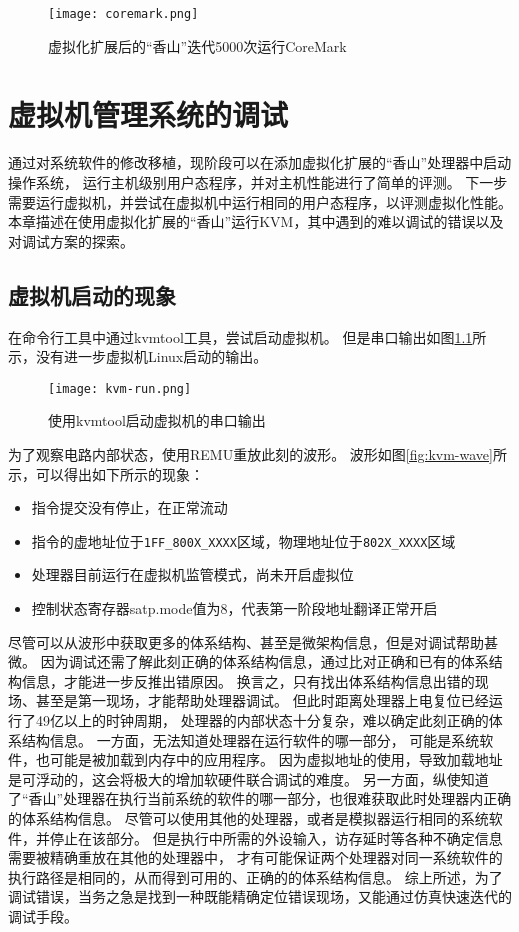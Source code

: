 \begin{figure}[htbp]
    \centering
\texttt{[image: coremark.png]}
\caption{虚拟化扩展后的“香山”迭代5000次运行CoreMark}
\label{fig:coremark}
\end{figure}

\chapter{虚拟机管理系统的调试}
通过对系统软件的修改移植，现阶段可以在添加虚拟化扩展的“香山”处理器中启动操作系统，
运行主机级别用户态程序，并对主机性能进行了简单的评测。
下一步需要运行虚拟机，并尝试在虚拟机中运行相同的用户态程序，以评测虚拟化性能。
本章描述在使用虚拟化扩展的“香山”运行KVM，其中遇到的难以调试的错误以及对调试方案的探索。

\section{虚拟机启动的现象}
在命令行工具中通过kvmtool工具，尝试启动虚拟机。
但是串口输出如图\ref{fig:kvm-run}所示，没有进一步虚拟机Linux启动的输出。

\begin{figure}[htbp]
    \centering
    \texttt{[image: kvm-run.png]}
    \caption{使用kvmtool启动虚拟机的串口输出}
    \label{fig:kvm-run}
\end{figure}

为了观察电路内部状态，使用REMU重放此刻的波形。
波形如图\ref{fig:kvm-wave}所示，可以得出如下所示的现象：

\begin{itemize}
    \item 指令提交没有停止，在正常流动
    \item 指令的虚地址位于\verb|1FF_800X_XXXX|区域，物理地址位于\verb|802X_XXXX|区域
    \item 处理器目前运行在虚拟机监管模式，尚未开启虚拟位
    \item 控制状态寄存器satp.mode值为8，代表第一阶段地址翻译正常开启
\end{itemize}

尽管可以从波形中获取更多的体系结构、甚至是微架构信息，但是对调试帮助甚微。
因为调试还需了解此刻正确的体系结构信息，通过比对正确和已有的体系结构信息，才能进一步反推出错原因。
换言之，只有找出体系结构信息出错的现场、甚至是第一现场，才能帮助处理器调试。
但此时距离处理器上电复位已经运行了49亿以上的时钟周期，
处理器的内部状态十分复杂，难以确定此刻正确的体系结构信息。
一方面，无法知道处理器在运行软件的哪一部分，
可能是系统软件，也可能是被加载到内存中的应用程序。
因为虚拟地址的使用，导致加载地址是可浮动的，这会将极大的增加软硬件联合调试的难度。
另一方面，纵使知道了“香山”处理器在执行当前系统的软件的哪一部分，也很难获取此时处理器内正确的体系结构信息。
尽管可以使用其他的处理器，或者是模拟器运行相同的系统软件，并停止在该部分。
但是执行中所需的外设输入，访存延时等各种不确定信息需要被精确重放在其他的处理器中，
才有可能保证两个处理器对同一系统软件的执行路径是相同的，从而得到可用的、正确的的体系结构信息。
综上所述，为了调试错误，当务之急是找到一种既能精确定位错误现场，又能通过仿真快速迭代的调试手段。

